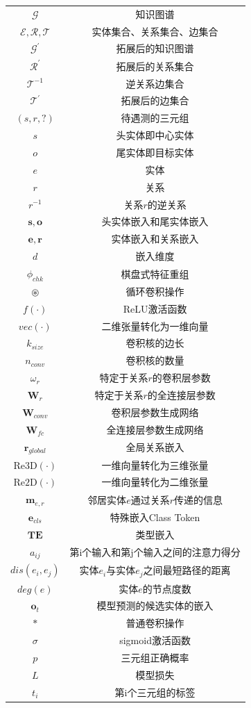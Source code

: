 \begin{longtable}[htbp]{cc}
  $\mathcal{G}$   &   知识图谱      \\
  $\mathcal{E}, \mathcal{R}, \mathcal{T}$   &   实体集合、关系集合、边集合      \\
  $\mathcal{G}^\prime$  &  拓展后的知识图谱      \\
  $\mathcal{R}^{\prime}$   &   拓展后的关系集合      \\
  $\mathcal{T}^{-1}$   &   逆关系边集合      \\
  $\mathcal{T}^{\prime}$   &   拓展后的边集合      \\
  $(s,r,?)$  &   待遇测的三元组      \\
  $s$   &   头实体即中心实体      \\
  $o$   &   尾实体即目标实体      \\
  $e$   &   实体      \\
  $r$   &   关系      \\
  $r^{-1}$   &   关系$r$的逆关系      \\
  $\boldsymbol{s},\boldsymbol{o}$ & 头实体嵌入和尾实体嵌入\\
  $\boldsymbol{e},\boldsymbol{r}$ & 实体嵌入和关系嵌入\\
  $d$ &嵌入维度\\
  $\phi_{chk}$ & 棋盘式特征重组\\
  $\circledast$ & 循环卷积操作\\
  $f(\cdot )$ & ReLU激活函数\\
  $vec(\cdot)$ & 二维张量转化为一维向量\\
  $k_{size}$ &卷积核的边长\\
  $n_{conv}$ &卷积核的数量\\
  $\omega_r$ & 特定于关系$r$的卷积层参数\\
  $\mathbf{W}_r$ &特定于关系$r$的全连接层参数\\
  $\mathbf{W}_{conv}$ & 卷积层参数生成网络\\
  $\mathbf{W}_{fc}$ & 全连接层参数生成网络\\
  $\boldsymbol{r}_{global}$ & 全局关系嵌入\\
  $\mbox{Re3D}(\cdot)$ & 一维向量转化为三维张量\\
  $\mbox{Re2D}(\cdot)$ & 一维向量转化为二维张量\\
  $\boldsymbol{m}_{e,r}$ & 邻居实体$e$通过关系$r$传递的信息\\
  $\boldsymbol{e}_{cls}$ & 特殊嵌入Class Token\\
  $\mathbf{TE}$ & 类型嵌入\\
  $a_{ij}$ & 第i个输入和第j个输入之间的注意力得分\\
  $dis(e_i,e_j)$ & 实体$e_i$与实体$e_j$之间最短路径的距离\\
  $deg(e)$ & 实体$e$的节点度数\\
  $\boldsymbol{o}_t$ & 模型预测的候选实体的嵌入\\
  $\ast $ & 普通卷积操作\\
  $\sigma $ & sigmoid激活函数\\
  $p$ & 三元组正确概率\\
  $L$ & 模型损失\\
  $t_i$ & 第i个三元组的标签\\


\end{longtable}
